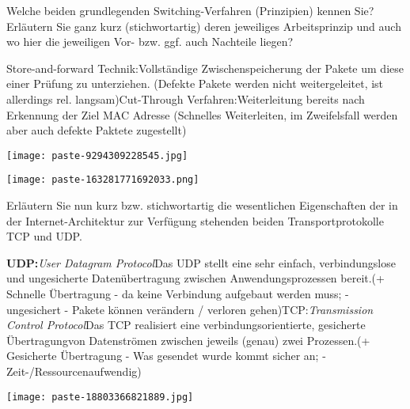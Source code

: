 \documentclass{article}
\begin{document}
\begin{tcolorbox}[colback=white!10!white,colframe=lightgray!75!black,
  savelowerto=\jobname_ex.tex,breakable,enhanced,lines before break=40]

\justifying
Welche beiden grundlegenden Switching-Verfahren (Prinzipien) kennen Sie? Erläutern Sie ganz kurz (stichwortartig) deren jeweiliges Arbeitsprinzip und auch wo hier die jeweiligen Vor- bzw. ggf. auch Nachteile liegen?

\tcblower

\justifying
Store-and-forward Technik:Vollständige Zwischenspeicherung der Pakete um diese einer Prüfung zu unterziehen. (Defekte Pakete werden nicht weitergeleitet, ist allerdings rel. langsam)Cut-Through Verfahren:Weiterleitung bereits nach Erkennung der Ziel MAC Adresse (Schnelles Weiterleiten, im Zweifelsfall werden aber auch defekte Paktete zugestellt)\begin{center}
\texttt{[image: paste-9294309228545.jpg]}
\end{center}
\begin{center}
\texttt{[image: paste-163281771692033.png]}
\end{center}

\end{tcolorbox}
\begin{tcolorbox}[colback=white!10!white,colframe=lightgray!75!black,
  savelowerto=\jobname_ex.tex,breakable,enhanced,lines before break=40]

\justifying
Erläutern Sie nun kurz bzw. stichwortartig die wesentlichen Eigenschaften der in der Internet-Architektur zur Verfügung stehenden beiden Transportprotokolle TCP und UDP.

\tcblower

\justifying
\textbf{UDP:}\textit{User Datagram Protocol}Das UDP stellt eine sehr einfach, verbindungslose und ungesicherte Datenübertragung zwischen Anwendungsprozessen bereit.(+ Schnelle Übertragung - da keine Verbindung aufgebaut werden muss; - ungesichert - Pakete können verändern / verloren gehen)TCP:\textit{Transmission Control Protocol}Das TCP realisiert eine verbindungsorientierte, gesicherte Übertragungvon Datenströmen zwischen jeweils (genau) zwei Prozessen.(+ Gesicherte Übertragung - Was gesendet wurde kommt sicher an; - Zeit-/Ressourcenaufwendig)\begin{center}
\texttt{[image: paste-18803366821889.jpg]}
\end{center}

\end{tcolorbox}
\end{document}
